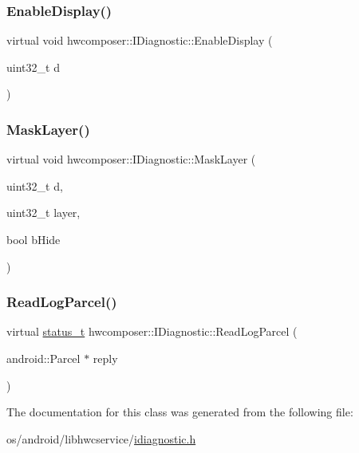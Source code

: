 \mbox{\label{classhwcomposer_1_1IDiagnostic_a56f95024619fc80d9f022462392818e3}} 
\subsubsection{\texorpdfstring{Enable\+Display()}{EnableDisplay()}}
{\footnotesize\ttfamily virtual void hwcomposer\+::\+I\+Diagnostic\+::\+Enable\+Display (\begin{DoxyParamCaption}\item[{uint32\+\_\+t}]{d }\end{DoxyParamCaption})\hspace{0.3cm}{\ttfamily [pure virtual]}}

\mbox{\label{classhwcomposer_1_1IDiagnostic_aadfea7c0adee73575567a580105f841e}} 
\subsubsection{\texorpdfstring{Mask\+Layer()}{MaskLayer()}}
{\footnotesize\ttfamily virtual void hwcomposer\+::\+I\+Diagnostic\+::\+Mask\+Layer (\begin{DoxyParamCaption}\item[{uint32\+\_\+t}]{d,  }\item[{uint32\+\_\+t}]{layer,  }\item[{bool}]{b\+Hide }\end{DoxyParamCaption})\hspace{0.3cm}{\ttfamily [pure virtual]}}

\mbox{\label{classhwcomposer_1_1IDiagnostic_ade22f6b73a1912c02dec2a2baaa14a4a}} 
\subsubsection{\texorpdfstring{Read\+Log\+Parcel()}{ReadLogParcel()}}
{\footnotesize\ttfamily virtual \mbox{\hyperlink{hwcserviceapi_8h_a3806fb2027d9a316d8ca8d9b8b8eb96f}{status\+\_\+t}} hwcomposer\+::\+I\+Diagnostic\+::\+Read\+Log\+Parcel (\begin{DoxyParamCaption}\item[{android\+::\+Parcel $\ast$}]{reply }\end{DoxyParamCaption})\hspace{0.3cm}{\ttfamily [pure virtual]}}



The documentation for this class was generated from the following file\+:\begin{DoxyCompactItemize}
\item 
os/android/libhwcservice/\mbox{\hyperlink{idiagnostic_8h}{idiagnostic.\+h}}\end{DoxyCompactItemize}
